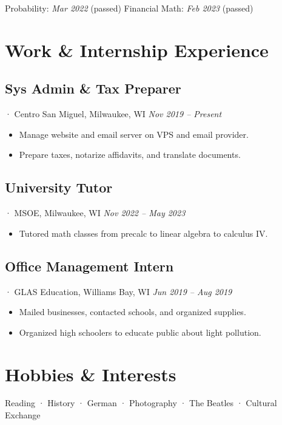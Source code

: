 \documentclass[12pt]{article}
\newcommand{\itemspace}[0]{
  \vspace{0.3170em}
}
\begin{document}
Probability:\; \textit{Mar 2022} (passed)
\hfill
Financial Math:\; \textit{Feb 2023} (passed)

\itemspace

\section{Work \& Internship Experience}

\subsection{Sys Admin \& Tax Preparer}
· Centro San Miguel, Milwaukee, WI \hfill \textit{Nov 2019 -- Present}

\begin{itemize}[noitemsep,nolistsep]
  \item Manage website and email server on VPS and email provider.

  \item Prepare taxes, notarize affidavits, and translate documents.
\end{itemize}

\itemspace

\subsection{University Tutor}
· MSOE, Milwaukee, WI \hfill \textit{Nov 2022 -- May 2023}

\begin{itemize}[noitemsep,nolistsep]
  \item Tutored math classes from precalc to linear algebra to calculus IV.
\end{itemize}

\itemspace

\subsection{Office Management Intern}
· GLAS Education, Williams Bay, WI  \hfill \textit{Jun 2019 -- Aug 2019}

\begin{itemize}[noitemsep,nolistsep]
  \item Mailed businesses, contacted schools, and organized supplies.

  \item Organized high schoolers to educate public about light pollution.
\end{itemize}

\itemspace

\section{Hobbies \& Interests}

Reading · History · German · Photography · The Beatles · Cultural Exchange

\vfill
\end{document}
